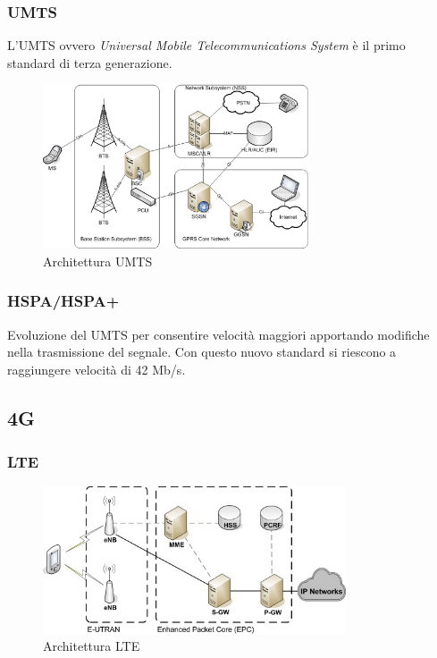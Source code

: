 \subsubsection{UMTS}
L'UMTS ovvero \textit{Universal Mobile Telecommunications System} è il primo standard di terza generazione.
\begin{figure}[ht]
    \centering
    \includegraphics[width=0.7\textwidth]{images/3g-umts.png}
    \caption{Architettura UMTS}
\end{figure}


\subsubsection{HSPA/HSPA+}
Evoluzione del UMTS per consentire velocità maggiori apportando modifiche nella trasmissione del segnale.
Con questo nuovo standard si riescono a raggiungere velocità di 42 Mb/s.

\clearpage

\subsection{4G}

\subsubsection{LTE}
\begin{figure}[ht]
    \centering
    \includegraphics[width=0.8\textwidth]{images/4g-lte.jpg}
    \caption{Architettura LTE}
\end{figure}

